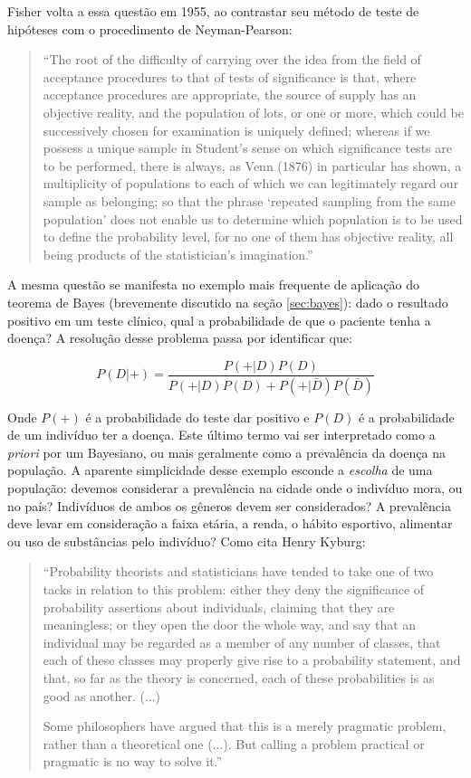 Fisher volta a essa questão em 1955, ao contrastar seu método de teste de hipóteses com o procedimento de Neyman-Pearson:

\begin{quote}
``The root of the difficulty of carrying over the idea from the field of acceptance procedures to that of tests of significance
is that, where acceptance procedures are appropriate, the source of supply has an objective reality, and the population
of lots, or one or more, which could be successively chosen for examination is uniquely defined; whereas if we possess a unique
sample in Student's sense on which significance tests are to be performed, there is always, as Venn (1876) in particular has
shown, a multiplicity of populations to each of which we can legitimately regard our sample as belonging; so that the phrase
`repeated sampling from the same population' does not enable us to determine which population is to be used to define the
probability level, for no one of them has objective reality, all being products of the statistician's imagination.''
\citep{Fisher1955}
\end{quote}

A mesma questão se manifesta no exemplo mais frequente de aplicação do teorema de Bayes (brevemente discutido
na seção \ref{sec:bayes}): dado o resultado positivo em um
teste clínico, qual a probabilidade de que o paciente tenha a doença? A resolução desse problema passa por identificar que:

\begin{equation}
P(D|+) = \frac{P(+|D)P(D)}{P(+|D)P(D)+P(+|\bar D) P(\bar D)}
\end{equation}

Onde $P(+)$ é a probabilidade do teste dar positivo 
e $P(D)$ é a probabilidade de um
indivíduo ter a doença. Este último termo vai ser interpretado como a {\em priori} por um Bayesiano, ou mais geralmente
como a prevalência da doença na população. A aparente simplicidade desse exemplo esconde a {\em escolha} de uma população:
devemos considerar a prevalência na cidade onde o indivíduo mora, ou no país? Indivíduos de ambos os gêneros devem ser
considerados? A prevalência deve levar em consideração a faixa etária, a renda, o hábito esportivo, alimentar ou uso de
substâncias pelo indivíduo? Como cita Henry Kyburg:

\begin{quote}
``Probability theorists and statisticians have tended to take one of two tacks in relation to this problem:
either they deny the significance of probability assertions about individuals, claiming that they are meaningless;
or they open the door the whole way, and say that an individual may be regarded as a member of any number of classes, 
that each of these classes may properly give rise to a probability statement, and that, so far as the theory is concerned,
each of these probabilities is as good as another. (...)

Some philosophers have argued that this is a merely pragmatic problem, rather than a theoretical one (...). But calling
a problem practical or pragmatic is no way to solve it.'' \citep{Kyburg74}
\end{quote}

